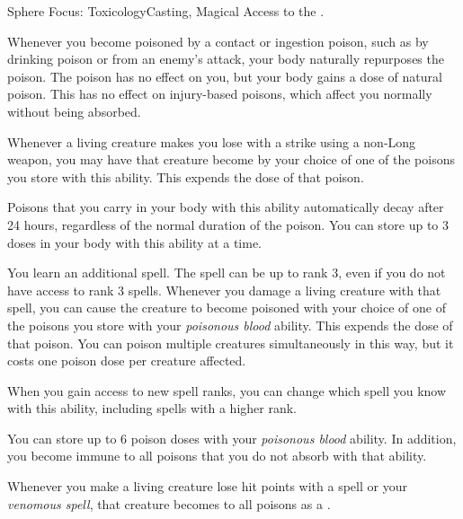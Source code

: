     \begin{magicalfeat}{Sphere Focus: Toxicology}{Casting, Magical}
        \featpre Access to the  .

         Whenever you become poisoned by a contact or ingestion poison, such as by drinking poison or from an enemy's attack, your body naturally repurposes the poison.
        The poison has no effect on you, but your body gains a dose of natural poison.
        This has no effect on injury-based poisons, which affect you normally without being absorbed.

        Whenever a living creature makes you lose  with a  strike using a non-Long weapon, you may have that creature become  by your choice of one of the poisons you store with this ability.
        This expends the dose of that poison.

        Poisons that you carry in your body with this ability automatically decay after 24 hours, regardless of the normal duration of the poison.
        You can store up to 3 doses in your body with this ability at a time.

         You learn an additional spell.
        The spell can be up to rank 3, even if you do not have access to rank 3 spells.
        Whenever you damage a living creature with that spell, you can cause the creature to become poisoned with your choice of one of the poisons you store with your \textit{poisonous blood} ability.
        This expends the dose of that poison.
        You can poison multiple creatures simultaneously in this way, but it costs one poison dose per creature affected.

        When you gain access to new spell ranks, you can change which spell you know with this ability, including spells with a higher rank.

         You can store up to 6 poison doses with your \textit{poisonous blood} ability.
        In addition, you become immune to all poisons that you do not absorb with that ability.

         Whenever you make a living creature lose hit points with a  spell or your \textit{venomous spell}, that creature becomes \vulnerable to all poisons as a .
    \end{magicalfeat}

